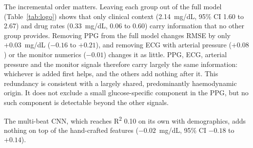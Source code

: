 \documentclass[11pt]{article}
\newcommand{\RR}{R\textsuperscript{2}}
\newcommand{\mgdl}{mg/dL}
\begin{document}
The incremental order matters. Leaving each group out of the full model (Table~\ref{tab:logo}) shows that only clinical context (2.14~\mgdl{}, 95\% CI 1.60 to 2.67) and drug rates (0.33~\mgdl{}, 0.06 to 0.60) carry information that no other group provides. Removing PPG from the full model changes RMSE by only $+0.03$~\mgdl{} ($-0.16$ to $+0.21$), and removing ECG with arterial pressure ($+0.08$) or the monitor numerics ($-0.01$) changes it as little. PPG, ECG, arterial pressure and the monitor signals therefore carry largely the same information: whichever is added first helps, and the others add nothing after it. This redundancy is consistent with a largely shared, predominantly haemodynamic origin. It does not exclude a small glucose-specific component in the PPG, but no such component is detectable beyond the other signals.

 The multi-beat CNN, which reaches \RR{} 0.10 on its own with demographics, adds nothing on top of the hand-crafted features ($-0.02$~\mgdl{}, 95\% CI $-0.18$ to $+0.14$).
\end{document}
